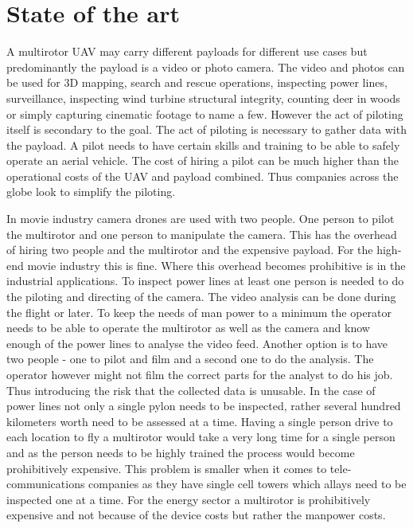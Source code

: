 \documentclass[12pt,oneside]{reedthesis}
\theoremstyle{definition}
\theoremstyle{definition}
\theoremstyle{definition}
\theoremstyle{remark}
\begin{document}
\chapter{State of the art}\label{state}

A multirotor UAV may carry different payloads for different use cases
but predominantly the payload is a video or photo camera. The video and
photos can be used for 3D mapping, search and rescue operations,
inspecting power lines, surveillance, inspecting wind turbine structural
integrity, counting deer in woods or simply capturing cinematic footage
to name a few. However the act of piloting itself is secondary to the
goal. The act of piloting is necessary to gather data with the payload.
A pilot needs to have certain skills and training to be able to safely
operate an aerial vehicle. The cost of hiring a pilot can be much higher
than the operational costs of the UAV and payload combined. Thus
companies across the globe look to simplify the piloting.

In movie industry camera drones are used with two people. One person to
pilot the multirotor and one person to manipulate the camera. This has
the overhead of hiring two people and the multirotor and the expensive
payload. For the high-end movie industry this is fine. Where this
overhead becomes prohibitive is in the industrial applications. To
inspect power lines at least one person is needed to do the piloting and
directing of the camera. The video analysis can be done during the
flight or later. To keep the needs of man power to a minimum the
operator needs to be able to operate the multirotor as well as the
camera and know enough of the power lines to analyse the video feed.
Another option is to have two people - one to pilot and film and a
second one to do the analysis. The operator however might not film the
correct parts for the analyst to do his job. Thus introducing the risk
that the collected data is unusable. In the case of power lines not only
a single pylon needs to be inspected, rather several hundred kilometers
worth need to be assessed at a time. Having a single person drive to
each location to fly a multirotor would take a very long time for a
single person and as the person needs to be highly trained the process
would become prohibitively expensive. This problem is smaller when it
comes to tele-communications companies as they have single cell towers
which allays need to be inspected one at a time. For the energy sector a
multirotor is prohibitively expensive and not because of the device
costs but rather the manpower costs.
\end{document}
